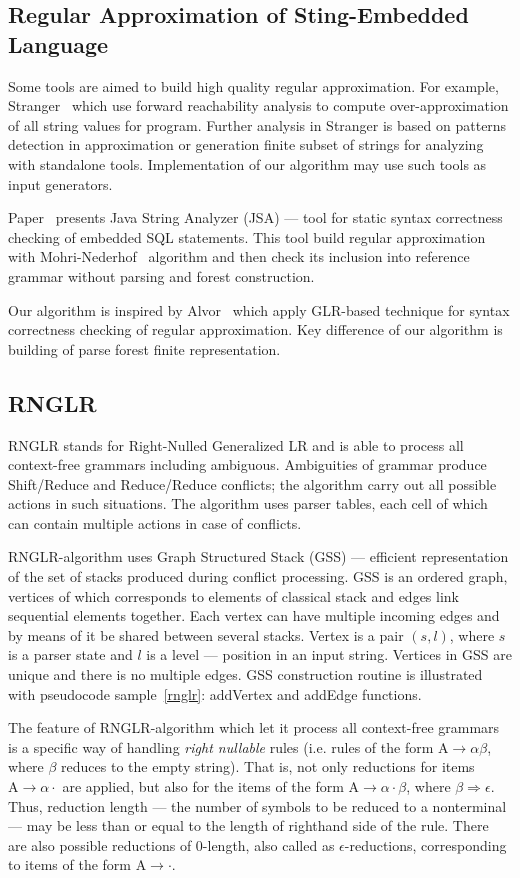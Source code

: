 \documentclass{llncs}
\begin{document}
\subsection{Regular Approximation of Sting-Embedded Language}
Some tools are aimed to build high quality regular approximation. For example, 
Stranger~\cite{Stranger} which use forward reachability analysis to compute 
over-approximation of all string values for program. Further analysis in Stranger 
is based on patterns detection in approximation or generation finite subset of 
strings for analyzing with standalone tools. Implementation of our algorithm may 
use such tools as input generators.

Paper~\cite{JSA} presents Java String Analyzer (JSA) — tool for static syntax 
correctness checking of embedded SQL statements.  This tool build regular approximation 
with Mohri-Nederhof~\cite{MohriNederhof} algorithm and then check its inclusion into reference grammar 
without parsing and forest construction.
 
Our algorithm is inspired by Alvor~\cite{Alvor} which apply GLR-based technique 
for syntax correctness checking of regular approximation. Key difference of our 
algorithm is building of parse forest finite representation. 

\subsection{RNGLR}
RNGLR stands for Right-Nulled Generalized LR and is able to process all context-free 
grammars including ambiguous. Ambiguities of grammar produce Shift/Reduce and 
Reduce/Reduce conflicts; the algorithm carry out all possible actions in such situations. 
The algorithm uses parser tables, each cell of which can contain multiple actions 
in case of conflicts. 

RNGLR-algorithm uses Graph Structured Stack (GSS) — efficient representation of 
the set of stacks produced during conflict processing. GSS is an ordered graph, 
vertices of which corresponds to elements of classical stack and edges link sequential 
elements together. Each vertex can have multiple incoming edges and by means of 
it be shared between several stacks. Vertex is a pair $(s, l)$, where $s$ is a 
parser state and $l$ is a level — position in an input string. Vertices in GSS 
are unique and there is no multiple edges. GSS construction routine is illustrated 
with pseudocode sample~\ref{rnglr}: addVertex and addEdge functions. 

The feature of RNGLR-algorithm which let it process all context-free grammars is
a specific way of handling \textit{right nullable} rules (i.e. rules of the form 
$\mathrm{A} \rightarrow \alpha \beta$, where $\beta$ reduces to the empty string). 
That is, not only reductions for items $\mathrm{A} \rightarrow \alpha \cdot$ are 
applied, but also for the items of the form  $\mathrm{A} \rightarrow \alpha \cdot 
\beta$, where $\beta \Rightarrow \epsilon$. Thus, reduction length — the number of 
symbols to be reduced to a nonterminal — may be less than or equal to the length 
of righthand side of the rule. There are also possible reductions of 0-length, 
also called as $\epsilon$-reductions, corresponding to items of the form $\mathrm{A} 
\rightarrow \cdot$. 
\end{document}
